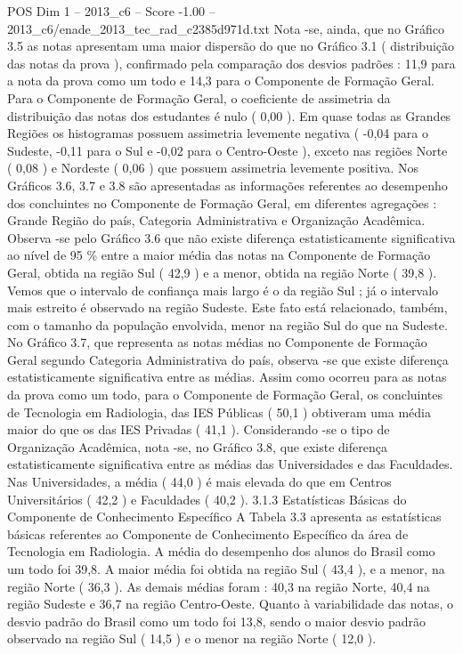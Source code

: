 \begin{textsample}{POS Dim 1 – 2013\_c6 – Score -1.00 – 2013\_c6/enade\_2013\_tec\_rad\_c2385d971d.txt}
Nota -se, ainda, que no Gráfico 3.5 as notas apresentam uma maior dispersão do que no Gráfico 3.1 ( distribuição das notas da prova ), confirmado pela comparação dos desvios padrões : 11,9 para a nota da prova como um todo e 14,3 para o Componente de Formação Geral.
Para o Componente de Formação Geral, o coeficiente de assimetria da distribuição das notas dos estudantes é nulo ( 0,00 ).
Em quase todas as Grandes Regiões os histogramas possuem assimetria levemente negativa ( -0,04 para o Sudeste, -0,11 para o Sul e -0,02 para o Centro-Oeste ), exceto nas regiões Norte ( 0,08 ) e Nordeste ( 0,06 ) que possuem assimetria levemente positiva.
Nos Gráficos 3.6, 3.7 e 3.8 são apresentadas as informações referentes ao desempenho dos concluintes no Componente de Formação Geral, em diferentes agregações : Grande Região do país, Categoria Administrativa e Organização Acadêmica.
Observa -se pelo Gráfico 3.6 que não existe diferença estatisticamente significativa ao nível de 95 \% entre a maior média das notas na Componente de Formação Geral, obtida na região Sul ( 42,9 ) e a menor, obtida na região Norte ( 39,8 ).
Vemos que o intervalo de confiança mais largo é o da região Sul ; já o intervalo mais estreito é observado na região Sudeste.
Este fato está relacionado, também, com o tamanho da população envolvida, menor na região Sul do que na Sudeste.
No Gráfico 3.7, que representa as notas médias no Componente de Formação Geral segundo Categoria Administrativa do país, observa -se que existe diferença estatisticamente significativa entre as médias.
Assim como ocorreu para as notas da prova como um todo, para o Componente de Formação Geral, os concluintes de Tecnologia em Radiologia, das IES Públicas ( 50,1 ) obtiveram uma média maior do que os das IES Privadas ( 41,1 ).
Considerando -se o tipo de Organização Acadêmica, nota -se, no Gráfico 3.8, que existe diferença estatisticamente significativa entre as médias das Universidades e das Faculdades.
Nas Universidades, a média ( 44,0 ) é mais elevada do que em Centros Universitários ( 42,2 ) e Faculdades ( 40,2 ). 3.1.3 Estatísticas Básicas do Componente de Conhecimento Específico A Tabela 3.3 apresenta as estatísticas básicas referentes ao Componente de Conhecimento Específico da área de Tecnologia em Radiologia.
A média do desempenho dos alunos do Brasil como um todo foi 39,8.
A maior média foi obtida na região Sul ( 43,4 ), e a menor, na região Norte ( 36,3 ).
As demais médias foram : 40,3 na região Norte, 40,4 na região Sudeste e 36,7 na região Centro-Oeste.
Quanto à variabilidade das notas, o desvio padrão do Brasil como um todo foi 13,8, sendo o maior desvio padrão observado na região Sul ( 14,5 ) e o menor na região Norte ( 12,0 ).

\end{textsample}
